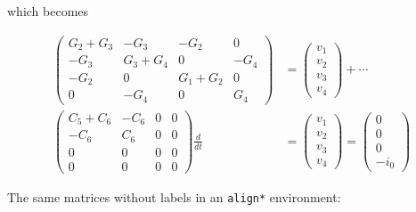 \documentclass[]{article}
\begin{document}
which becomes

\[
\begin{align}
\begin{pmatrix}
G_2 + G_3 & -G_3 & -G_2 & 0 \\ 
-G_3 & G_3 + G_4 & 0 & -G_4 \\ 
-G_2 & 0 & G_1 + G_2 & 0 \\ 
0 & -G_4 & 0 & G_4
\end{pmatrix}
&=
\begin{pmatrix}
v_1 \\ 
v_2 \\ 
v_3 \\ 
v_4
\end{pmatrix}
+ \cdots
\label{_mymatrixeq}\\ 
\begin{pmatrix}
C_5 + C_6 & -C_6 & 0 & 0 \\ 
-C_6 & C_6 & 0 & 0 \\ 
0 & 0 & 0 & 0 \\ 
0 & 0 & 0 & 0
\end{pmatrix}
\frac{d}{dt} &=
\begin{pmatrix}
v_1 \\ 
v_2 \\ 
v_3 \\ 
v_4
\end{pmatrix} =
\begin{pmatrix}
0 \\ 
0 \\ 
0 \\ 
-i_0
\end{pmatrix}
\end{align}
\]

The same matrices without labels in an \texttt{align*} environment:
\end{document}
